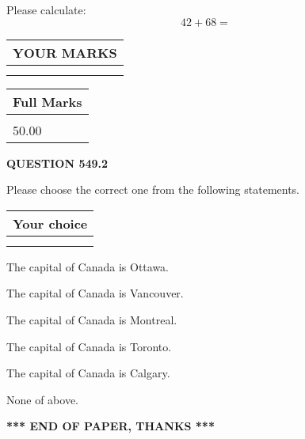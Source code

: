 \documentclass[12pt]{article}
\begin{document}
  
 
Please calculate:
\begin{equation}
42 +  %
68 = \nonumber
\end{equation}
 

 

 
  
\vspace{0.2in}
  
\noindent\begin{tabular}{|l|}
\hline
 YOUR MARKS  \\
\hline
 \\ 
 \\ 
\hline
\end{tabular}
\hspace{0.05in} \begin{tabular}{|l|}
\hline
 Full Marks  \\
\hline
 \\ 
50.00 \\
\hline
\end{tabular}
{\textbf{\Large{QUESTION
549.2 
}}}
  
  
Please choose the correct one from the following statements.
  
  
\noindent\hspace{3.0in} \begin{tabular}{|l|}
\hline
Your choice \\
\hline
 \\ 
 \\ 
\hline
\end{tabular}
  
  
 
 
The capital of Canada is Ottawa.
 
 
The capital of Canada is Vancouver.
 
 
The capital of Canada is Montreal.
 
 
The capital of Canada is Toronto.
 
 
The capital of Canada is Calgary.
 
 
 None of above.
 
 
   
   
 \vspace{0.2in}
 
   
   
   
   
\vspace{1.0in} 
{\textbf{\large{ *** END OF PAPER, THANKS *** }}} 
   
\end{document}
